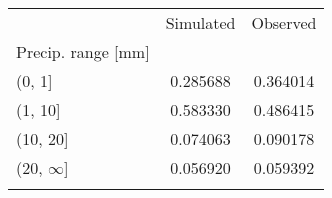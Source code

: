 \begin{tabular}{lcc}
\tophline
{} &  Simulated &  Observed \\
Precip. range [mm] &             &           \\
\middlehline
(0, 1]             &    0.285688 &  0.364014 \\
(1, 10]            &    0.583330 &  0.486415 \\
(10, 20]           &    0.074063 &  0.090178 \\
(20, $\infty$]          &    0.056920 &  0.059392 \\
\bottomhline
\end{tabular}
